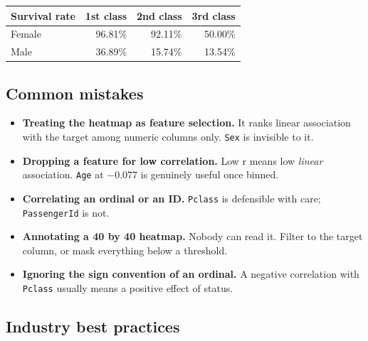 \documentclass[11pt,a4paper]{article}
\begin{document}
\begin{tabularx}{\textwidth}{@{}l r r r@{}}
\toprule
\rowcolor{tablehead} \textbf{Survival rate} & \textbf{1st class} & \textbf{2nd class} & \textbf{3rd class} \\
\midrule
Female & 96.81\% & 92.11\% & 50.00\% \\
Male & 36.89\% & 15.74\% & 13.54\% \\
\bottomrule
\end{tabularx}


\subsection*{Common mistakes}

\begin{itemize}\itemsep3pt
  \item \textbf{Treating the heatmap as feature selection.} It ranks linear association
        with the target among numeric columns only. \texttt{Sex} is invisible to it.
  \item \textbf{Dropping a feature for low correlation.} Low r means low \emph{linear}
        association. \texttt{Age} at $-0.077$ is genuinely useful once binned.
  \item \textbf{Correlating an ordinal or an ID.} \texttt{Pclass} is defensible with care;
        \texttt{PassengerId} is not.
  \item \textbf{Annotating a 40 by 40 heatmap.} Nobody can read it. Filter to the target
        column, or mask everything below a threshold.
  \item \textbf{Ignoring the sign convention of an ordinal.} A negative correlation with
        \texttt{Pclass} usually means a positive effect of status.
\end{itemize}

\subsection*{Industry best practices}
\end{document}
